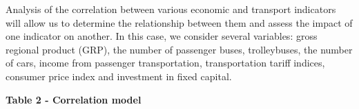 Analysis of the correlation between various economic and transport
indicators will allow us to determine the relationship between them and
assess the impact of one indicator on another. In this case, we consider
several variables: gross regional product (GRP), the number of passenger
buses, trolleybuses, the number of cars, income from passenger
transportation, transportation tariff indices, consumer price index and
investment in fixed capital.

{\bfseries Table 2 - Correlation model}
\begin{table}[H]
\centering
{}
\end{table}
